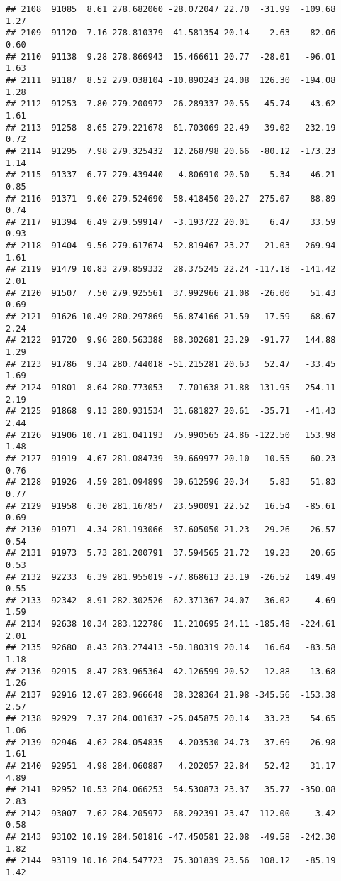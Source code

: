 \documentclass[]{article}
\begin{document}
\begin{verbatim}
## 2108  91085  8.61 278.682060 -28.072047 22.70  -31.99  -109.68  1.27
## 2109  91120  7.16 278.810379  41.581354 20.14    2.63    82.06  0.60
## 2110  91138  9.28 278.866943  15.466611 20.77  -28.01   -96.01  1.63
## 2111  91187  8.52 279.038104 -10.890243 24.08  126.30  -194.08  1.28
## 2112  91253  7.80 279.200972 -26.289337 20.55  -45.74   -43.62  1.61
## 2113  91258  8.65 279.221678  61.703069 22.49  -39.02  -232.19  0.72
## 2114  91295  7.98 279.325432  12.268798 20.66  -80.12  -173.23  1.14
## 2115  91337  6.77 279.439440  -4.806910 20.50   -5.34    46.21  0.85
## 2116  91371  9.00 279.524690  58.418450 20.27  275.07    88.89  0.74
## 2117  91394  6.49 279.599147  -3.193722 20.01    6.47    33.59  0.93
## 2118  91404  9.56 279.617674 -52.819467 23.27   21.03  -269.94  1.61
## 2119  91479 10.83 279.859332  28.375245 22.24 -117.18  -141.42  2.01
## 2120  91507  7.50 279.925561  37.992966 21.08  -26.00    51.43  0.69
## 2121  91626 10.49 280.297869 -56.874166 21.59   17.59   -68.67  2.24
## 2122  91720  9.96 280.563388  88.302681 23.29  -91.77   144.88  1.29
## 2123  91786  9.34 280.744018 -51.215281 20.63   52.47   -33.45  1.69
## 2124  91801  8.64 280.773053   7.701638 21.88  131.95  -254.11  2.19
## 2125  91868  9.13 280.931534  31.681827 20.61  -35.71   -41.43  2.44
## 2126  91906 10.71 281.041193  75.990565 24.86 -122.50   153.98  1.48
## 2127  91919  4.67 281.084739  39.669977 20.10   10.55    60.23  0.76
## 2128  91926  4.59 281.094899  39.612596 20.34    5.83    51.83  0.77
## 2129  91958  6.30 281.167857  23.590091 22.52   16.54   -85.61  0.69
## 2130  91971  4.34 281.193066  37.605050 21.23   29.26    26.57  0.54
## 2131  91973  5.73 281.200791  37.594565 21.72   19.23    20.65  0.53
## 2132  92233  6.39 281.955019 -77.868613 23.19  -26.52   149.49  0.55
## 2133  92342  8.91 282.302526 -62.371367 24.07   36.02    -4.69  1.59
## 2134  92638 10.34 283.122786  11.210695 24.11 -185.48  -224.61  2.01
## 2135  92680  8.43 283.274413 -50.180319 20.14   16.64   -83.58  1.18
## 2136  92915  8.47 283.965364 -42.126599 20.52   12.88    13.68  1.26
## 2137  92916 12.07 283.966648  38.328364 21.98 -345.56  -153.38  2.57
## 2138  92929  7.37 284.001637 -25.045875 20.14   33.23    54.65  1.06
## 2139  92946  4.62 284.054835   4.203530 24.73   37.69    26.98  1.61
## 2140  92951  4.98 284.060887   4.202057 22.84   52.42    31.17  4.89
## 2141  92952 10.53 284.066253  54.530873 23.37   35.77  -350.08  2.83
## 2142  93007  7.62 284.205972  68.292391 23.47 -112.00    -3.42  0.58
## 2143  93102 10.19 284.501816 -47.450581 22.08  -49.58  -242.30  1.82
## 2144  93119 10.16 284.547723  75.301839 23.56  108.12   -85.19  1.42

\end{verbatim}
\end{document}
